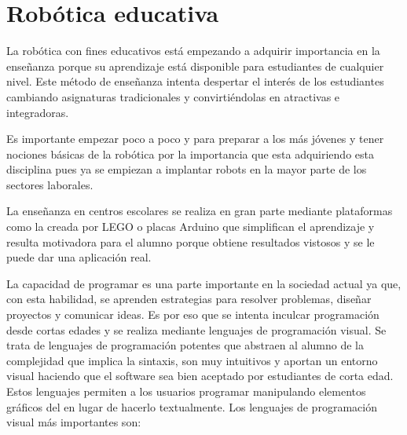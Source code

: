 \section{Robótica educativa}
\label{sec:educativa}
La robótica con fines educativos está empezando a adquirir importancia en la enseñanza porque su aprendizaje está disponible para estudiantes de cualquier nivel. Este método de enseñanza intenta despertar el interés de los estudiantes cambiando asignaturas tradicionales y convirtiéndolas en atractivas e integradoras. \newline

Es importante empezar poco a poco y para preparar a los más jóvenes y tener nociones básicas de la robótica por la importancia que esta adquiriendo esta disciplina pues ya se empiezan a implantar robots en la mayor parte de los sectores laborales. \newline

La enseñanza en centros escolares se realiza en gran parte mediante plataformas como la creada por LEGO o placas Arduino que simplifican el aprendizaje y resulta motivadora para el alumno porque obtiene resultados vistosos y se le puede dar una aplicación real. \newline

La capacidad de programar es una parte importante en la sociedad actual ya que, con esta habilidad, se aprenden estrategias para resolver problemas, diseñar proyectos y comunicar ideas. Es por eso que se intenta inculcar programación desde cortas edades y se realiza mediante lenguajes de programación visual. Se trata de lenguajes de programación potentes que abstraen al alumno de la complejidad que implica la sintaxis, son muy intuitivos y aportan un entorno visual haciendo que el software sea bien aceptado por estudiantes de corta edad. Estos lenguajes permiten a los usuarios programar manipulando elementos gráficos del en lugar de hacerlo textualmente. Los lenguajes de programación visual más importantes son: 

